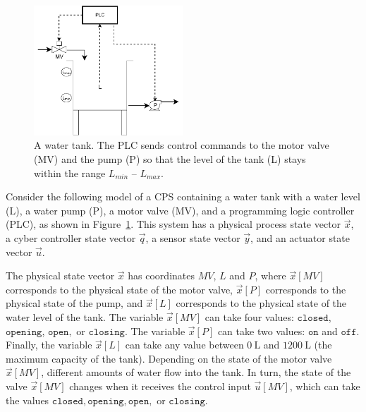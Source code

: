 \begin{figure}
  \centering
  \includegraphics[width=0.50\textwidth]{Figures/FillingTank.pdf}
  \caption{A water tank. The PLC sends control commands to the motor valve (MV) and the pump (P) so that the level of the tank (L) stays within the range $L_{min}$ -- $L_{max}$. }
  \label{fig:Motivational}
\end{figure}
Consider the following model of a CPS containing a water tank with a water level (L), a water pump (P), a motor valve (MV), and a programming logic controller (PLC), as shown in Figure~\ref{fig:Motivational}. This system has a physical process state vector $\vec{x}$, a cyber controller state vector $\vec{q}$, a sensor state vector $\vec{y}$, and an actuator state vector $\vec{u}$.

The physical state vector $\vec{x}$ has coordinates $MV$, $L$ and $P$, where $\vec{x}[MV]$ corresponds to the physical state of the motor valve, $\vec{x}[P]$ corresponds to the physical state of the pump, and $\vec{x}[L]$  corresponds to the physical state of the water level of the tank. The variable $\vec{x}[MV]$ can take four values: $\texttt{closed}$, $\texttt{opening}$, $\texttt{open},$ or $\texttt{closing}$. The variable $\vec{x}[P]$ can take two values: $\texttt{on}$ and $\texttt{off}$. Finally, the variable $\vec{x}[L]$ can take any value between $0 ~\mathrm{L}$ and $1200 ~\mathrm{L}$ (the maximum capacity of the tank). %
Depending on the state of the motor valve $\vec{x}[MV]$, different amounts of water flow into the tank. In turn, the state of the valve $\vec{x}[MV]$ changes when it receives the control input $\vec{u}[MV]$, which can take the values $\texttt{closed}, \texttt{opening},\texttt{open},$ or $\texttt{closing}$.  

